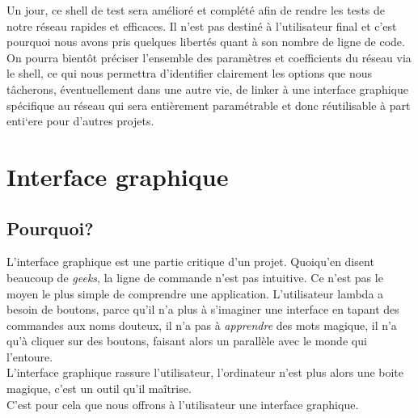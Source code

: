 \documentclass[a4paper,12pt]{report}
\begin{document}

Un jour, ce shell de test sera am\'elior\'e et compl\'et\'e afin de rendre les
tests de notre r\'eseau rapides et efficaces. Il n'est pas destin\'e \`a
l'utilisateur final et c'est pourquoi nous avons pris quelques
libert\'es quant \`a son nombre de ligne de code.
On pourra bient\^ot pr\'eciser l'ensemble des param\`etres et
coefficients du r\'eseau via le shell, ce qui nous permettra
d'identifier clairement les options que nous t\^acherons,
\'eventuellement dans une autre vie, de linker \`a une interface graphique
sp\'ecifique au r\'eseau qui sera enti\`erement param\'etrable et donc
r\'eutilisable \`a part enti`ere pour d'autres projets.





























\chapter{Interface graphique} %
\label{cha:interface_graphique}

\section{Pourquoi?} %
\label{sec:pourquoi_}
L’interface graphique est une partie critique d’un projet. Quoiqu’en disent beaucoup de \emph{geeks}, la ligne de commande n’est pas intuitive. Ce n’est pas le moyen le plus simple de comprendre une application. L’utilisateur lambda a besoin de boutons, parce qu’il n’a plus à s’imaginer une interface en tapant des commandes aux noms douteux, il n’a pas à \emph{apprendre} des mots magique, il n’a qu’à cliquer sur des boutons, faisant alors un parallèle avec le monde qui l’entoure. \\
L’interface graphique rassure l’utilisateur, l’ordinateur n’est plus alors une boite magique, c’est un outil qu’il maîtrise. \\
C’est pour cela que nous offrons à l’utilisateur une interface graphique.\\
\end{document}
